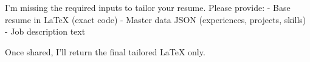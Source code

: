 I’m missing the required inputs to tailor your resume. Please provide:
- Base resume in LaTeX (exact code)
- Master data JSON (experiences, projects, skills)
- Job description text

Once shared, I’ll return the final tailored LaTeX only.